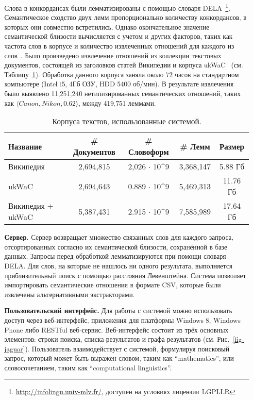 \documentclass[a4paper,10pt,twoside]{article}
\begin{document}
Слова в конкордансах были лемматизированы с помощью словаря DELA~\footnote{\url{http://infolingu.univ-mlv.fr/}, доступен на условиях лицензии LGPLLR}. Семантическое сходство двух лемм пропорционально количеству конкордансов, в которых они совместно встретились. Однако окончательное значение семантической близости вычисляется с учетом и других факторов, таких как частота слов в корпусе и количество извлеченных отношений для каждого из слов~\cite{panchenko2012konvens}. Было произведено извлечение отношений из коллекции текстовых документов, состоящей из заголовков статей Википедии и корпуса ukWaC~\cite{baroni2009wacky} (см. Таблицу~\ref{tbl:corpora}). Обработка данного корпуса заняла около 72 часов на стандартном компьютере (Intel i5, 4Гб ОЗУ, HDD 5400 об/мин). В результате извлечения было выявлено 11,251,240 нетипизированных семантических отношений, таких как  $\langle Canon, Nikon, 0.62 \rangle$, между 419,751 леммами. 

\begin{table}
\centering
\footnotesize
\begin{tabular}{|l|c|c|c|c|}
  \hline              
  Название & \# Документов & \# Словоформ & \# Лемм &  Размер \\ \hline         \hline           
  Википедия & 2,694,815 & 2,026 $\cdot$ 10^9 & 3,368,147 & 5.88 Гб \\
  ukWaC & 2,694,643 & 0.889 $\cdot$ 10^9 & 5,469,313 & 11.76 Гб \\ 
  Википедия + ukWaC & 5,387,431 & 2.915 $\cdot$ 10^9 & 7,585,989 & 17.64 Гб\\
  \hline  
\end{tabular}
\caption{Корпуса текстов, использованные системой.}
\label{tbl:corpora}
\end{table}

\textbf{Сервер.} Сервер возвращает множество связанных слов для каждого запроса, отсортированных согласно их семантической близости, сохранённой в базе данных. Запросы перед обработкой лемматизируются при помощи словаря DELA. Для слов, на которые не нашлось ни одного результата, выполняется приблизительный поиск с помощью расстояния Левенштейна. Система позволяет импортировать семантические отношения в формате CSV, которые были извлечены альтернативными экстракторами.

\textbf{Пользовательский интерфейс.} Для работы с системой можно использовать доступ через веб-интерфейс, приложения для платформы Windows 8, Windows Phone либо RESTful веб-сервис. Веб-интерфейс состоит из трёх основных элементов: строки поиска, списка результатов и графа результатов (см. Рис.~\ref{fig-jaguar}). Пользователь взаимодействует с системой, формулируя поисковый запрос, который может быть выражен словом, таким как ``mathematics'', или словосочетанием, таким как ``computational linguistics''. 
\end{document}
